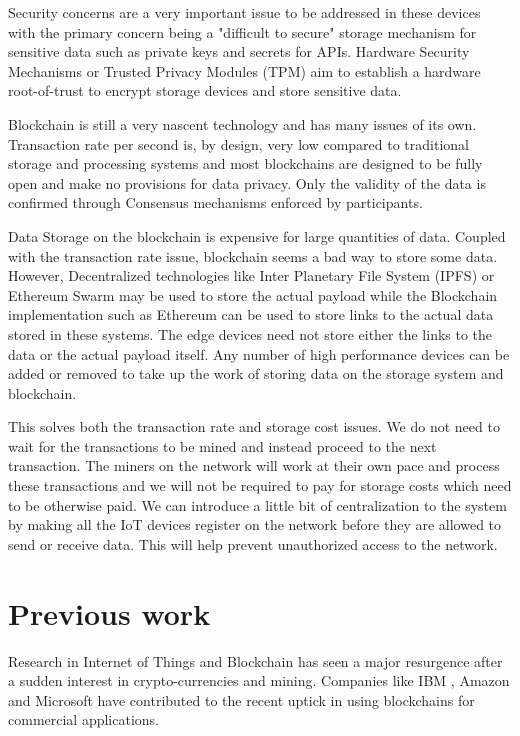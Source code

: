 \documentclass[11pt,openright]{report}
\begin{document}
Security concerns are a very important issue to be addressed in these devices with the primary concern being a "difficult to secure" storage mechanism for sensitive data such as private keys and secrets for APIs. Hardware Security Mechanisms or Trusted Privacy Modules (TPM) aim to establish a hardware root-of-trust to encrypt storage devices and store sensitive data.

Blockchain is still a very nascent technology and has many issues of its own. Transaction rate per second is, by design, very low compared to traditional storage and processing systems and most blockchains are designed to be fully open and make no provisions for data privacy. Only the validity of the data is confirmed through Consensus mechanisms enforced by participants.

Data Storage on the blockchain is expensive for large quantities of data. Coupled with the transaction rate issue, blockchain seems a bad way to store some data. However, Decentralized technologies like Inter Planetary File System (IPFS) or Ethereum Swarm may be used to store the actual payload while the Blockchain implementation such as Ethereum can be used to store links to the actual data stored in these systems. The edge devices need not store either the links to the data or the actual payload itself. Any number of high performance devices can be added or removed to take up the work of storing data on the storage system and blockchain. 

This solves both the transaction rate and storage cost issues. We do not need to wait for the transactions to be mined and instead proceed to the next transaction. The miners on the network will work at their own pace and process these transactions and we will not be required to pay for storage costs which need to be otherwise paid. We can introduce a little bit of centralization to the system by making all the IoT devices register on the network before they are allowed to send or receive data. This will help prevent unauthorized access to the network.

\section{Previous work}\label{section:previouswork}
Research in Internet of Things and Blockchain has seen a major resurgence after a sudden interest in crypto-currencies and mining. Companies like IBM \cite{Androulaki:2018:HFD:3190508.3190538}, Amazon and Microsoft have contributed to the recent uptick in using blockchains for commercial applications. 
\end{document}
